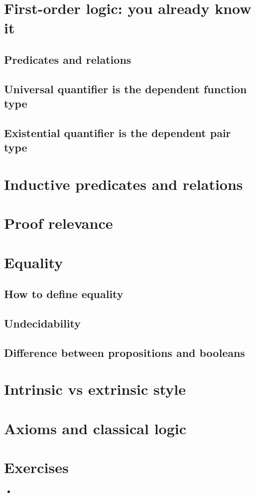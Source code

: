 \documentclass{beamer}
\begin{document}


\section{First-order logic: you already know it}

\subsection{Predicates and relations}

\subsection{Universal quantifier is the dependent function type}
\subsection{Existential quantifier is the dependent pair type}

\section{Inductive predicates and relations}

\section{Proof relevance}

\section{Equality}
\subsection{How to define equality}
\subsection{Undecidability}
\subsection{Difference between propositions and booleans}

\section{Intrinsic vs extrinsic style}

\section{Axioms and classical logic}

\section{Exercises}

\begin{frame}{}
\begin{itemize}
	\item 
\end{itemize}
\end{frame}
\end{document}

